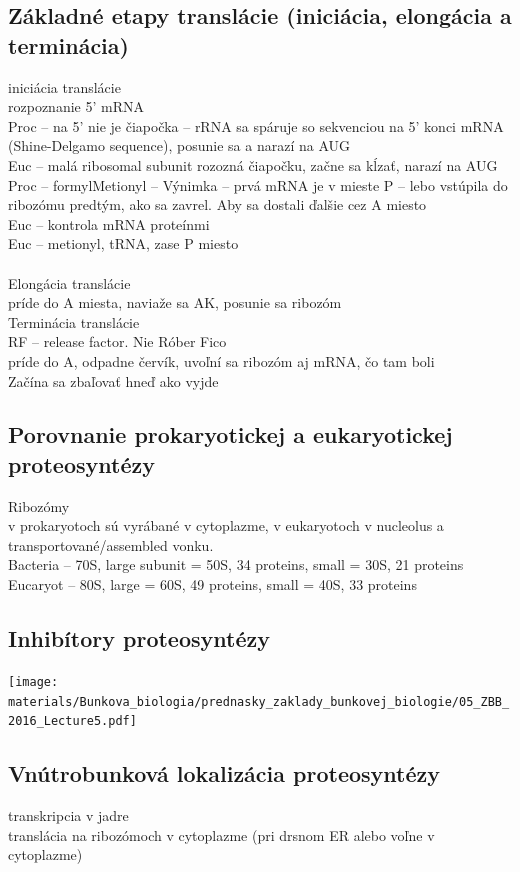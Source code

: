 \subsection{Základné etapy translácie (iniciácia, elongácia a terminácia)}
iniciácia translácie \\
\tab rozpoznanie 5' mRNA\\
\tab Proc -- na 5' nie je čiapočka -- rRNA sa spáruje so sekvenciou na 5' konci mRNA (Shine-Delgamo sequence), posunie sa a narazí na AUG \\
\tab Euc -- malá ribosomal subunit rozozná čiapočku, začne sa kĺzať, narazí na AUG \\
\tab Proc -- formylMetionyl -- Výnimka -- prvá mRNA je v mieste P -- lebo vstúpila do ribozómu predtým, ako sa zavrel. Aby sa dostali ďalšie cez A miesto\\
\tab Euc -- kontrola mRNA proteínmi\\
\tab Euc -- metionyl, tRNA, zase P miesto\\
\tab \\
Elongácia translácie\\
\tab príde do A miesta, naviaže sa AK, posunie sa ribozóm\\
Terminácia translácie\\
\tab RF -- release factor. Nie Róber Fico\\
\tab príde do A, odpadne červík, uvoľní sa ribozóm aj mRNA, čo tam boli\\
Začína sa zbaľovať hneď ako vyjde\\
\subsection{Porovnanie prokaryotickej a eukaryotickej proteosyntézy}
Ribozómy\\
\tab v prokaryotoch sú vyrábané v cytoplazme, v eukaryotoch v nucleolus a transportované/assembled vonku.\\
Bacteria -- 70S, large subunit = 50S, 34 proteins, small = 30S, 21 proteins\\
Eucaryot -- 80S, large = 60S, 49 proteins, small = 40S, 33 proteins\\
\subsection{Inhibítory proteosyntézy}
\texttt{[image: materials/Bunkova\_biologia/prednasky\_zaklady\_bunkovej\_biologie/05\_ZBB\_2016\_Lecture5.pdf]}\\
\subsection{Vnútrobunková lokalizácia proteosyntézy}
transkripcia v jadre\\
translácia na ribozómoch v cytoplazme (pri drsnom ER alebo voľne v cytoplazme)\\
